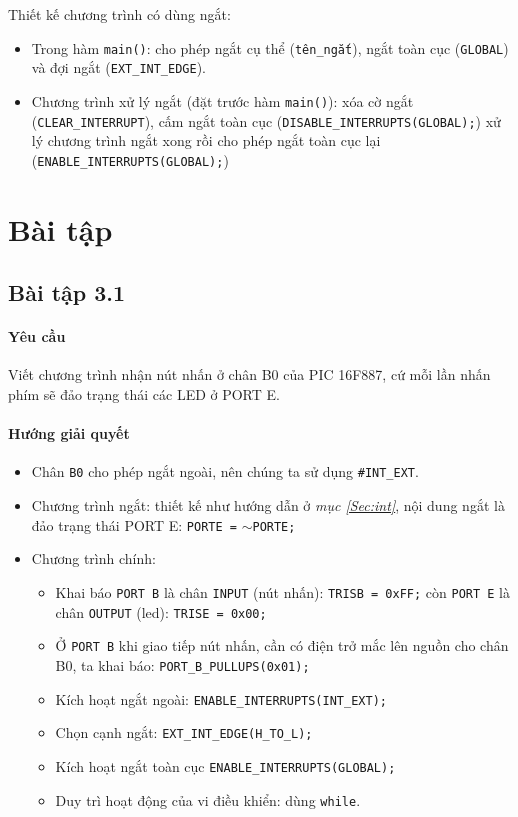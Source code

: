 Thiết kế chương trình có dùng ngắt:
\begin{itemize}
\item Trong hàm \verb|main()|: cho phép ngắt cụ thể (\verb|tên_ngắt|), ngắt toàn cục (\verb|GLOBAL|) và đợi ngắt (\verb|EXT_INT_EDGE|).
\item Chương trình xử lý ngắt (đặt trước hàm \verb|main()|): xóa cờ ngắt (\verb|CLEAR_INTERRUPT|), cấm ngắt toàn cục (\verb|DISABLE_INTERRUPTS(GLOBAL);|) xử lý chương trình ngắt xong rồi cho phép ngắt toàn cục lại (\verb|ENABLE_INTERRUPTS(GLOBAL);|)
\end{itemize}
\section{Bài tập}
\subsection{Bài tập 3.1}
\paragraph{Yêu cầu}Viết chương trình nhận nút nhấn ở chân B0 của PIC 16F887, cứ mỗi lần nhấn phím sẽ đảo trạng thái các LED ở PORT E.
\paragraph{Hướng giải quyết}
\begin{itemize}
\item Chân \verb|B0| cho phép ngắt ngoài, nên chúng ta sử dụng \verb|#INT_EXT|.
\item Chương trình ngắt: thiết kế như hướng dẫn ở \emph{mục \ref{Sec:int}}, nội dung ngắt là đảo trạng thái PORT E: \verb|PORTE =| $\sim$\verb|PORTE;|
\item Chương trình chính: 
\begin{itemize}
\item Khai báo \verb|PORT B| là chân \verb|INPUT| (nút nhấn): \verb|TRISB = 0xFF;| còn \verb|PORT E| là chân \verb|OUTPUT| (led): \verb|TRISE = 0x00;|
\item Ở \verb|PORT B| khi giao tiếp nút nhấn, cần có điện trở mắc lên nguồn cho chân B0, ta khai báo: \verb|PORT_B_PULLUPS(0x01);|
\item Kích hoạt ngắt ngoài: \verb|ENABLE_INTERRUPTS(INT_EXT);| 
\item Chọn cạnh ngắt: \verb|EXT_INT_EDGE(H_TO_L);| \item Kích hoạt ngắt toàn cục \verb|ENABLE_INTERRUPTS(GLOBAL);|
\item Duy trì hoạt động của vi điều khiển: dùng \verb|while|.
\end{itemize}
\end{itemize}
